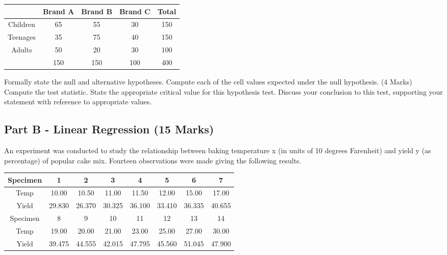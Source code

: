 {
	\begin{center}
		\begin{tabular}{|c||c|c|c||c|} \hline
			&	Brand A	&	Brand B	&	Brand C	&	Total	\\ \hline		\hline
			Children	&	65	&	55	&	30	&	150	\\ \hline	
			Teenages	&	35	&	75	&	40	&	150	\\ \hline	
			Adults	&	50	&	20	&	30	&	100	\\ \hline	\hline
			&	150	&	150	&	100	&	400	\\ \hline	 
		\end{tabular} 
	\end{center}
}
\begin{enumerate}[(i)]
  Formally state the null and alternative hypotheses.
  Compute each of the cell values expected under the null hypothesis. 
 (4 Marks) Compute the test statistic.
  State the appropriate critical value for this hypothesis test.
  Discuss your conclusion to this test, supporting your statement with reference to appropriate values.
\end{enumerate}




\subsection*{Part B - Linear Regression (15 Marks)}

An experiment was conducted to study the relationship between baking temperature x (in units of 10 degrees Farenheit) and yield y (as percentage) of popular cake mix. Fourteen observations were made giving the following results.





\begin{center}
	\begin{tabular}{|c||c|c|c|c|c|c|c|}
		\hline
		Specimen & 1 & 2 & 3 & 4 & 5 & 6 & 7 \\ \hline
		\hline
		Temp &  10.00 & 10.50 & 11.00 & 11.50 & 12.00 & 15.00 & 17.00 \\ \hline 
		Yield &  29.830&  26.370 & 30.325 &36.100 &33.410 &36.335 & 40.655 \\ \hline 
		\hline\hline
		Specimen & 8 & 9 & 10 & 11 & 12 & 13 & 14 \\  \hline
		Temp &  19.00 & 20.00 & 21.00 & 23.00 & 25.00 & 27.00 & 30.00 \\ \hline
		Yield &  39.475& 44.555&  42.015 & 47.795 & 45.560&  51.045 & 47.900 \\ \hline 
		\hline
	\end{tabular}
\end{center}

